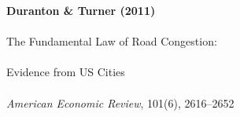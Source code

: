\documentclass[12pt]{article}
\begin{document}
\begin{center}
{\Large\bfseries Duranton \& Turner (2011)}\\\\
{\large The Fundamental Law of Road Congestion:}\\\\
{\large Evidence from US Cities}\\\\
\vspace{0.5em}
{\normalsize \textit{American Economic Review}, 101(6), 2616--2652}
\end{center}

\vspace{1em}




\end{document}
